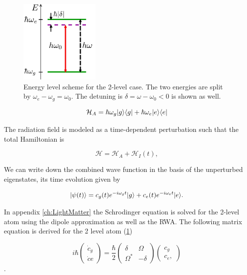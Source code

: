 \begin{figure}
	\centering
	\includegraphics[height=4.1cm]{figures/2LevelAtom.pdf}
	\caption{Energy level scheme for the 2-level case. The two energies are split by $\omega_e - \omega_g = \omega_0$. The detuning is $\delta = \omega-\omega_0<0$ is shown as well.}
	\label{fig:2LevelAtom}
\end{figure}

\begin{equation}\label{eq:AtomHamiltonianMain}
	\mathcal{H}_A = \hbar \omega_g \lvert g\rangle\langle g\rvert + \hbar \omega_e \lvert e\rangle\langle e\rvert
\end{equation}

The radiation field is modeled as a time-dependent perturbation such that the total Hamiltonian is \cite{Leeuwen2017}

\begin{equation}\label{eq:PerturbationMain}
	\mathcal{H} = \mathcal{H}_A + \mathcal{H}_{I}(t),
\end{equation}

We can write down the combined wave function in the basis of the unperturbed eigenstates, its time evolution given by

\begin{equation}\label{eq:TwoLevelMain}
	\lvert\psi(t)\rangle = c_g(t) e^{-i \omega_g t} \lvert g\rangle + c_e(t) e^{-i \omega_e t} \lvert e\rangle.
\end{equation}

In appendix \ref{ch:LightMatter} the Schrodinger equation is solved for the 2-level atom using the dipole approximation as well as the \acf*{RWA}. The following matrix equation is derived for the 2 level atom (\cref{fig:2LevelAtom}) \cite{Foot2005}

\begin{equation}\label{eq:MatrixEvolution}
	i \hbar \begin{pmatrix}
		\dot{c}_g \\ 
		\dot{c}e
	\end{pmatrix}
	= \frac{\hbar}{2} \begin{pmatrix}
		\delta & \Omega \\ \Omega^* & -\delta 
	\end{pmatrix} 
	\begin{pmatrix}
		c_g \\ c_e,
	\end{pmatrix}
\end{equation}.

